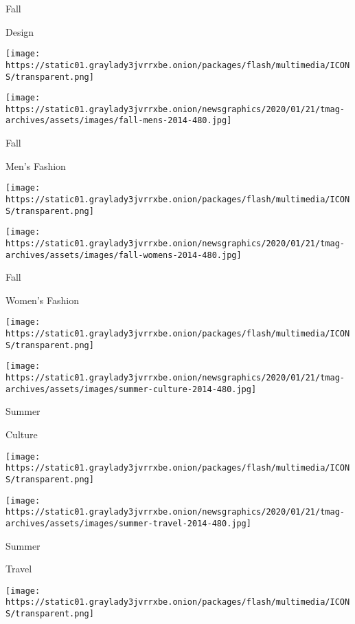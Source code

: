 Fall

Design

\href{https://www.nytimes3xbfgragh.onion/indexes/2014/09/14/t-magazine/mens-fashion-issue/index.html}{}

\texttt{[image: https://static01.graylady3jvrrxbe.onion/packages/flash/multimedia/ICONS/transparent.png]}

\texttt{[image: https://static01.graylady3jvrrxbe.onion/newsgraphics/2020/01/21/tmag-archives/assets/images/fall-mens-2014-480.jpg]}

Fall

Men's Fashion

\href{https://www.nytimes3xbfgragh.onion/indexes/2014/08/24/t-magazine/womens-fashion-issue/index.html}{}

\texttt{[image: https://static01.graylady3jvrrxbe.onion/packages/flash/multimedia/ICONS/transparent.png]}

\texttt{[image: https://static01.graylady3jvrrxbe.onion/newsgraphics/2020/01/21/tmag-archives/assets/images/fall-womens-2014-480.jpg]}

Fall

Women's Fashion

\href{https://www.nytimes3xbfgragh.onion/indexes/2014/06/15/t-magazine/design-issue/index.html}{}

\texttt{[image: https://static01.graylady3jvrrxbe.onion/packages/flash/multimedia/ICONS/transparent.png]}

\texttt{[image: https://static01.graylady3jvrrxbe.onion/newsgraphics/2020/01/21/tmag-archives/assets/images/summer-culture-2014-480.jpg]}

Summer

Culture

\href{https://www.nytimes3xbfgragh.onion/indexes/2014/05/11/t-magazine/travel-issue/index.html}{}

\texttt{[image: https://static01.graylady3jvrrxbe.onion/packages/flash/multimedia/ICONS/transparent.png]}

\texttt{[image: https://static01.graylady3jvrrxbe.onion/newsgraphics/2020/01/21/tmag-archives/assets/images/summer-travel-2014-480.jpg]}

Summer

Travel

\href{https://www.nytimes3xbfgragh.onion/indexes/2014/06/14/t-magazine/design-issue/index.html}{}

\texttt{[image: https://static01.graylady3jvrrxbe.onion/packages/flash/multimedia/ICONS/transparent.png]}

